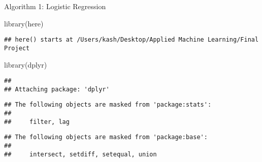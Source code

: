 \documentclass[
]{article}
\newenvironment{Shaded}{\begin{snugshade}}{\end{snugshade}}
\newcommand{\FunctionTok}[1]{\textcolor[rgb]{0.00,0.00,0.00}{#1}}
\newcommand{\NormalTok}[1]{#1}
\begin{document}
Algorithm 1: Logistic Regression

\begin{Shaded}
\begin{Highlighting}[]
\FunctionTok{library}\NormalTok{(here)}
\end{Highlighting}
\end{Shaded}

\begin{verbatim}
## here() starts at /Users/kash/Desktop/Applied Machine Learning/Final Project
\end{verbatim}

\begin{Shaded}
\begin{Highlighting}[]
\FunctionTok{library}\NormalTok{(dplyr)}
\end{Highlighting}
\end{Shaded}

\begin{verbatim}
## 
## Attaching package: 'dplyr'
\end{verbatim}

\begin{verbatim}
## The following objects are masked from 'package:stats':
## 
##     filter, lag
\end{verbatim}

\begin{verbatim}
## The following objects are masked from 'package:base':
## 
##     intersect, setdiff, setequal, union
\end{verbatim}
\end{document}
